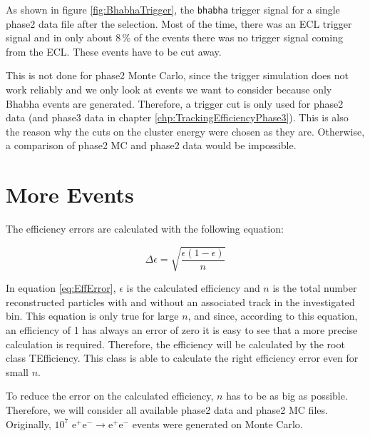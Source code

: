 \documentclass[a4paper,11pt,twosided,final,german,openbib,pdftex,listof=totoc,bibliography=totoc]{scrbook}
\begin{document}
As shown in figure \ref{fig:BhabhaTrigger}, the \texttt{bhabha} trigger signal for a single phase2 data file after the selection. Most of the time, there was an ECL trigger signal and in only about $8\,\%$ of the events there was no trigger signal coming from the ECL. These events have to be cut away.

This is not done for phase2 Monte Carlo, since the trigger simulation does not work reliably and we only look at events we want to consider because only Bhabha events are generated. Therefore, a trigger cut is only used for phase2 data (and phase3 data in chapter \ref{chp:TrackingEfficiencyPhase3}). This is also the reason why the cuts on the cluster energy were chosen as they are. Otherwise, a comparison of phase2 MC and phase2 data would be impossible.

\section{More Events}
\label{sec:Phase2MoreEvents}


The efficiency errors are calculated with the following equation:

\begin{equation}
\Delta \epsilon = \sqrt{\frac{\epsilon(1-\epsilon)}{n}}
\label{eq:EffError}
\end{equation}

In equation \ref{eq:EffError}, $\epsilon$ is the calculated efficiency and $n$ is the total number reconstructed particles with and without an associated track in the investigated bin. This equation is only true for large $n$, and since, according to this equation, an efficiency of 1 has always an error of zero it is easy to see that a more precise calculation is required. Therefore, the efficiency will be calculated by the root class TEfficiency. This class is able to calculate the right efficiency error even for small $n$. \cite{TEfficiency}



To reduce the error on the calculated efficiency, $n$ has to be as big as possible. Therefore, we will consider all available  phase2 data and phase2 MC files. Originally, $10^7$ $ \textrm{e}^+\textrm{e}^- \rightarrow  \textrm{e}^+\textrm{e}^-  $ events were generated on Monte Carlo.
\end{document}

